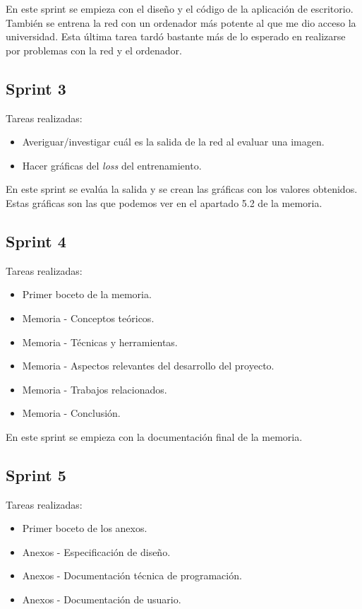 En este sprint se empieza con el diseño y el código de la aplicación de escritorio. También se entrena la red con un ordenador más potente al que me dio acceso la universidad. Esta última tarea tardó bastante más de lo esperado en realizarse por problemas con la red y el ordenador.

\subsection{Sprint 3}

Tareas realizadas:

\begin{itemize}
    \item Averiguar/investigar cuál es la salida de la red al evaluar una imagen.
    \item Hacer gráficas del \textit{loss} del entrenamiento.
\end{itemize}

En este sprint se evalúa la salida y se crean las gráficas con los valores obtenidos. Estas gráficas son las que podemos ver en el apartado 5.2 de la memoria.

\subsection{Sprint 4}

Tareas realizadas:

\begin{itemize}
    \item Primer boceto de la memoria.
    \item Memoria - Conceptos teóricos.
    \item Memoria - Técnicas y herramientas.
    \item Memoria - Aspectos relevantes del desarrollo del proyecto.
    \item Memoria - Trabajos relacionados.
    \item Memoria - Conclusión.
\end{itemize}

En este sprint se empieza con la documentación final de la memoria.

\subsection{Sprint 5}

Tareas realizadas:

\begin{itemize}
    \item Primer boceto de los anexos.
    \item Anexos - Especificación de diseño.
    \item Anexos - Documentación técnica de programación.
    \item Anexos - Documentación de usuario.
\end{itemize}

